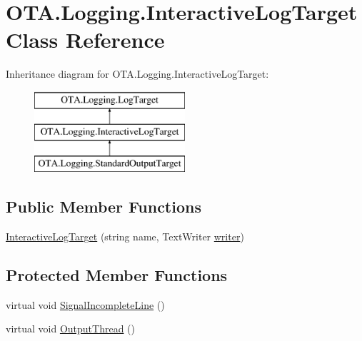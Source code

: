 \hypertarget{class_o_t_a_1_1_logging_1_1_interactive_log_target}{}\section{O\+T\+A.\+Logging.\+Interactive\+Log\+Target Class Reference}
\label{class_o_t_a_1_1_logging_1_1_interactive_log_target}
Inheritance diagram for O\+T\+A.\+Logging.\+Interactive\+Log\+Target\+:\begin{figure}[H]
\begin{center}
\leavevmode
\includegraphics[height=3.000000cm]{class_o_t_a_1_1_logging_1_1_interactive_log_target}
\end{center}
\end{figure}
\subsection*{Public Member Functions}
\begin{DoxyCompactItemize}
\item 
\hyperlink{class_o_t_a_1_1_logging_1_1_interactive_log_target_a294ebb85c0cc84d05355e33db6740b00}{Interactive\+Log\+Target} (string name, Text\+Writer \hyperlink{class_o_t_a_1_1_logging_1_1_interactive_log_target_a5d351f6ef26b84b2efa11a3b79c096f3}{writer})
\end{DoxyCompactItemize}
\subsection*{Protected Member Functions}
\begin{DoxyCompactItemize}
\item 
virtual void \hyperlink{class_o_t_a_1_1_logging_1_1_interactive_log_target_a8455838e9ed5adc40fee4ec97612a3fd}{Signal\+Incomplete\+Line} ()
\item 
virtual void \hyperlink{class_o_t_a_1_1_logging_1_1_interactive_log_target_a04fc613840ff6c213fba1795d96f00f3}{Output\+Thread} ()
\end{DoxyCompactItemize}
